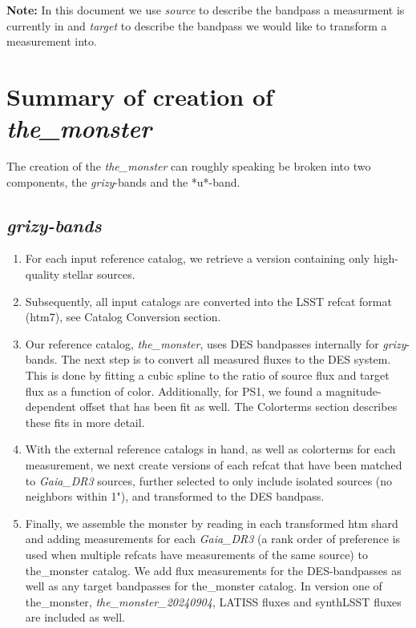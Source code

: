 \textbf{Note:} In this document we use \emph{source} to describe the bandpass a measurment is currently in and \emph{target} to describe the bandpass we would like to transform a measurement into. 

\section{Summary of creation of \textit{the\_monster}}
The creation of the \textit{the\_monster} can roughly speaking be broken into two components, the \textit{grizy}-bands and the *u*-band. 


\subsection{\textit{grizy-bands}}
\begin{enumerate}
    \item For each input reference catalog, we retrieve a version containing only high-quality stellar sources.
    \item Subsequently, all input catalogs are converted into the LSST refcat format (htm7), see Catalog Conversion section.
    \item Our reference catalog, \textit{the\_monster}, uses DES bandpasses internally for \textit{grizy}-bands. The next step is to convert all measured fluxes to the DES system. This is done by fitting a cubic spline to the ratio of source flux and target flux as a function of color. Additionally, for PS1, we found a magnitude-dependent offset that has been fit as well. The Colorterms section describes these fits in more detail.
    \item With the external reference catalogs in hand, as well as colorterms for each measurement, we next create versions of each refcat that have been matched to \textit{Gaia\_DR3} sources, further selected to only include isolated sources (no neighbors within 1"), and transformed to the DES bandpass.
    \item Finally, we assemble the monster by reading in each transformed htm shard and adding measurements for each \textit{Gaia\_DR3} (a rank order of preference is used when multiple refcats have measurements of the same source) to the\_monster catalog. We add flux measurements for the DES-bandpasses as well as any target bandpasses for the\_monster catalog. In version one of the\_monster, \textit{the\_monster\_20240904}, LATISS fluxes and synthLSST fluxes are included as well.
\end{enumerate}

